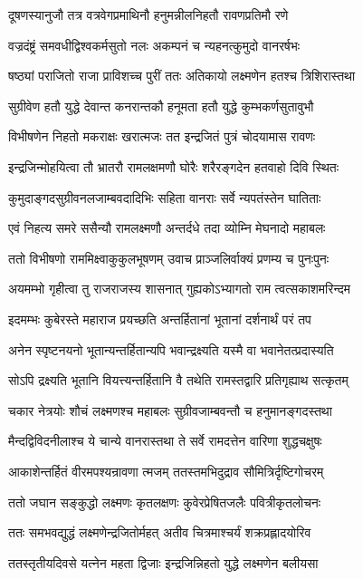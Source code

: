 \twolineshloka
{दूषणस्यानुजौ तत्र वत्रवेगप्रमाथिनौ}
{हनुमन्नीलनिहतौ रावणप्रतिमौ रणे}%

\twolineshloka
{वज्रदंष्ट्रं समवधीद्विश्वकर्मसुतो नलः}
{अकम्पनं च न्यहनत्कुमुदो वानरर्षभः}%

\twolineshloka
{षष्ठ्यां पराजितो राजा प्राविशच्च पुरीं ततः}
{अतिकायो लक्ष्मणेन हतश्च त्रिशिरास्तथा}%

\twolineshloka
{सुग्रीवेण हतौ युद्धे देवान्त कनरान्तकौ}
{हनूमता हतौ युद्धे कुम्भकर्णसुतावुभौ}%

\twolineshloka
{विभीषणेन निहतो मकराक्षः खरात्मजः}
{तत इन्द्रजितं पुत्रं चोदयामास रावणः}%

\twolineshloka
{इन्द्रजिन्मोहयित्वा तौ भ्रातरौ रामलक्षमणौ}
{घोरैः शरैरङ्गदेन हतवाहो दिवि स्थितः}%

\twolineshloka
{कुमुदाङ्गदसुग्रीवनलजाम्बवदादिभिः}
{सहिता वानराः सर्वे न्यपतंस्तेन घातिताः}%

\twolineshloka
{एवं निहत्य समरे ससैन्यौ रामलक्ष्मणौ}
{अन्तर्दधे तदा व्योम्नि मेघनादो महाबलः}%

\twolineshloka
{ततो विभीषणो राममिक्ष्वाकुकुलभूषणम्}
{उवाच प्राञ्जलिर्वाक्यं प्रणम्य च पुनःपुनः}%

\twolineshloka
{अयमम्भो गृहीत्वा तु राजराजस्य शासनात्}
{गुह्यकोऽभ्यागतो राम त्वत्सकाशमरिन्दम}%

\twolineshloka
{इदमम्भः कुबेरस्ते महाराज प्रयच्छति}
{अन्तर्हितानां भूतानां दर्शनार्थं परं तप}%

\twolineshloka
{अनेन स्पृष्टनयनो भूतान्यन्तर्हितान्यपि}
{भवान्द्रक्ष्यति यस्मै वा भवानेतत्प्रदास्यति}%

\twolineshloka
{सोऽपि द्रक्ष्यति भूतानि वियत्त्यन्तर्हितानि वै}
{तथेति रामस्तद्वारि प्रतिगृह्याथ सत्कृतम्}%

\twolineshloka
{चकार नेत्रयोः शौचं लक्ष्मणश्च महाबलः}
{सुग्रीवजाम्बवन्तौ च हनुमानङ्गदस्तथा}%

\twolineshloka
{मैन्दद्विविदनीलाश्च ये चान्ये वानरास्तथा}
{ते सर्वे रामदत्तेन वारिणा शुद्धचक्षुषः}%

\twolineshloka
{आकाशेन्तर्हितं वीरमपश्यन्रावणा त्मजम्}
{ततस्तमभिदुद्राव सौमित्रिर्दृष्टिगोचरम्}%

\twolineshloka
{ततो जघान सङ्कुद्धो लक्ष्मणः कृतलक्षणः}
{कुवेरप्रेषितजलैः पवित्रीकृतलोचनः}%

\twolineshloka
{ततः समभवद्युद्धं लक्ष्मणेन्द्रजितोर्महत्}
{अतीव चित्रमाश्चर्यं शक्रप्रह्लादयोरिव}%

\twolineshloka
{ततस्तृतीयदिवसे यत्नेन महता द्विजाः}
{इन्द्रजिन्निहतो युद्धे लक्ष्मणेन बलीयसा}%

